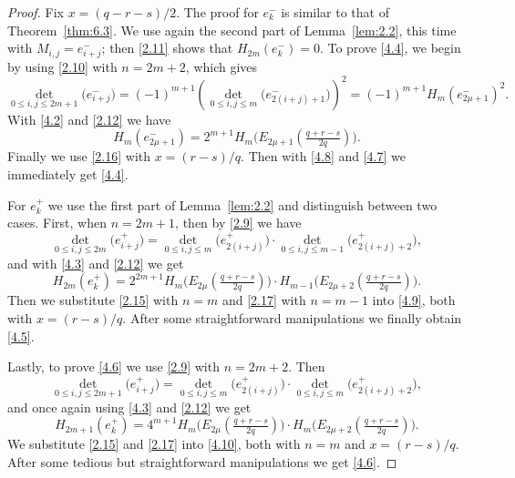 \documentclass{amsart}
\theoremstyle{plain}
\numberwithin{equation}{section}
\begin{document}
\begin{proof}
Fix $x=(q-r-s)/2$. The proof for $e_k^{-}$ is similar to that of Theorem~\ref{thm:6.3}. 
We use again the second part of Lemma~\ref{lem:2.2}, this time with 
$M_{i,j}=e_{i+j}^{-}$; then \eqref{2.11} shows that $H_{2m}(e_k^{-})=0$.
To prove \eqref{4.4}, we begin by using \eqref{2.10} with $n=2m+2$, which gives
\begin{equation}\label{4.7}
\det_{0\leq i,j\leq 2m+1}\big(e_{i+j}^{-}\big)
= (-1)^{m+1}\left(\det_{0\leq i,j\leq m}\big(e_{2(i+j)+1}^{-}\big)\right)^2
= (-1)^{m+1}H_m(e_{2\mu+1}^{-})^2.
\end{equation}
With \eqref{4.2} and \eqref{2.12} we have
\begin{equation}\label{4.8}
H_m(e_{2\mu+1}^{-}) = 2^{m+1}H_m\big(E_{2\mu+1}(\tfrac{q+r-s}{2q})\big).
\end{equation}
Finally we use \eqref{2.16} with $x=(r-s)/q$. Then with \eqref{4.8} and
\eqref{4.7} we immediately get \eqref{4.4}.

For $e_k^{+}$ we use the first part of Lemma~\ref{lem:2.2} and distinguish
between two cases. First, when $n=2m+1$, then by \eqref{2.9} we have
\[
\det_{0\leq i,j\leq 2m}\big(e_{i+j}^{+}\big)
= \det_{0\leq i,j\leq m}\big(e_{2(i+j)}^{+}\big)
\cdot\det_{0\leq i,j\leq m-1}\big(e_{2(i+j)+2}^{+}\big),
\]
and with \eqref{4.3} and \eqref{2.12} we get
\begin{equation}\label{4.9}
H_{2m}(e_{k}^{+}) = 2^{2m+1}H_m\big(E_{2\mu}(\tfrac{q+r-s}{2q})\big)
\cdot H_{m-1}\big(E_{2\mu+2}(\tfrac{q+r-s}{2q})\big).
\end{equation}
Then we substitute \eqref{2.15} with $n=m$ and \eqref{2.17} with $n=m-1$ into
\eqref{4.9}, both with $x=(r-s)/q$. After some straightforward manipulations
we finally obtain \eqref{4.5}.

Lastly, to prove \eqref{4.6} we use \eqref{2.9} with $n=2m+2$. Then 
\[
\det_{0\leq i,j\leq 2m+1}\big(e_{i+j}^{+}\big)
= \det_{0\leq i,j\leq m}\big(e_{2(i+j)}^{+}\big)
\cdot\det_{0\leq i,j\leq m}\big(e_{2(i+j)+2}^{+}\big),
\]
and once again using \eqref{4.3} and \eqref{2.12} we get
\begin{equation}\label{4.10}
H_{2m+1}(e_{k}^{+}) = 4^{m+1}H_m\big(E_{2\mu}(\tfrac{q+r-s}{2q})\big)
\cdot H_{m}\big(E_{2\mu+2}(\tfrac{q+r-s}{2q})\big).
\end{equation}
We substitute \eqref{2.15} and \eqref{2.17} into \eqref{4.10}, both with $n=m$ 
and $x=(r-s)/q$. After some tedious but straightforward manipulations we get
\eqref{4.6}.
\end{proof}
\end{document}

